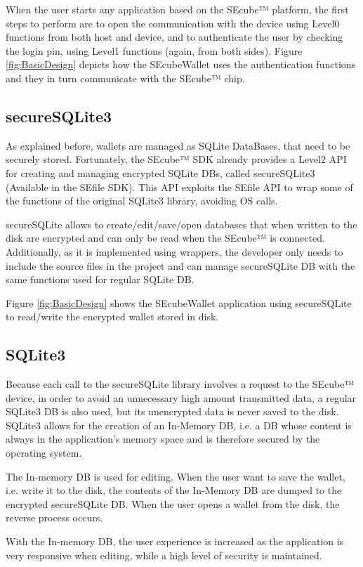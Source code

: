When the user starts any application based on the SEcube™ platform, the first steps to perform are to open the communication with the device using Level0 functions from both host and device, and to authenticate the user by checking the login pin, using Level1 functions (again, from both sides). Figure \ref{fig:BasicDesign} depicts how the SEcubeWallet uses the authentication functions and they in turn communicate with the SEcube™ chip.

\subsection{secureSQLite3}
As explained before, wallets are managed as SQLite DataBases, that need to be securely stored. Fortunately, the SEcube™ SDK already provides a Level2 API for creating and managing encrypted SQLite DBs, called secureSQLite3 (Available in the SEfile SDK\cite{SEcubeRes}). This API exploits the SEfile API to wrap some of the functions of the original SQLite3 library, avoiding OS calls.

secureSQLite allows to create/edit/save/open databases that when written to the disk are encrypted and can only be read when the SEcube™ is connected. Additionally, as it is implemented using wrappers, the developer only needs to include the source files in the project and can manage secureSQLite DB with the same functions used for regular SQLite DB.

Figure \ref{fig:BasicDesign} shows the SEcubeWallet application using secureSQLite to read/write the encrypted wallet stored in disk.

\subsection{SQLite3}
Because each call to the secureSQLite library involves a request to the SEcube™ device, in order to avoid an unnecessary high amount transmitted data, a regular SQLite3 DB is also used, but its unencrypted data is never saved to the disk. SQLite3 allows for the creation of an In-Memory DB, i.e. a DB whose content is always in the application's memory space and is therefore secured by the operating system. 

The In-memory DB is used for editing. When the user want to save the wallet, i.e. write it to the disk, the contents of the In-Memory DB are dumped to the encrypted secureSQLite DB. When the user opens a wallet from the disk, the reverse process occurs.

With the In-memory DB, the user experience is increased as the application is very responsive when editing, while a high level of security is maintained.

